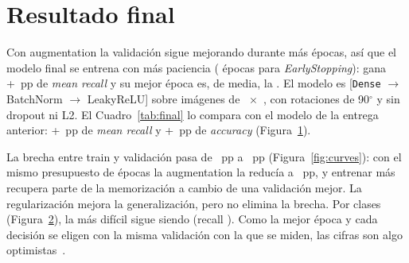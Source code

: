 \section{Resultado final}
Con augmentation la validación sigue mejorando durante más épocas, así que el modelo final se entrena con más
paciencia ( épocas para \emph{EarlyStopping}): gana +~pp de \emph{mean recall}
y su mejor época es, de media, la . El modelo es  [\texttt{Dense}
$\rightarrow$ BatchNorm $\rightarrow$ LeakyReLU] sobre imágenes de ~$\times$~, con
rotaciones de 90$^\circ$ y sin dropout ni L2. El Cuadro~\ref{tab:final} lo compara con el modelo de la entrega
anterior: +~pp de \emph{mean recall} y +~pp de \emph{accuracy} (Figura~\ref{fig:progress}).

\begin{table}[h]
  \centering\small
  \caption{Modelo de la entrega anterior frente al regularizado (validación; media $\pm$ desviación típica de
   semillas).}
  \label{tab:final}
\end{table}

La brecha entre train y validación pasa de ~pp a ~pp
(Figura~\ref{fig:curves}): con el mismo presupuesto de épocas la augmentation la reducía a ~pp, y
entrenar más recupera parte de la memorización a cambio de una validación mejor. La regularización mejora la
generalización, pero no elimina la brecha. Por clases (Figura~\ref{fig:final}), la más difícil sigue siendo
 (recall ). Como la mejor época y cada decisión se eligen con la misma
validación con la que se miden, las cifras son algo optimistas~\cite{cawley}.

\begin{figure}[!htbp]
  \centering
  \begin{minipage}[t]{0.485\linewidth}
    \centering
    \caption{}
    \label{fig:curves}
  \end{minipage}\hfill
  \begin{minipage}[t]{0.485\linewidth}
    \centering
    \caption{}
    \label{fig:progress}
  \end{minipage}
\end{figure}

\begin{figure}[!htbp]
  \centering
  \caption{}
  \label{fig:final}
\end{figure}
